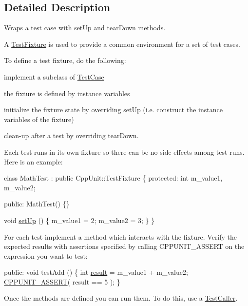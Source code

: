 \subsection{Detailed Description}
Wraps a test case with set\-Up and tear\-Down methods.

A \hyperlink{class_test_fixture}{Test\-Fixture} is used to provide a common environment for a set of test cases. 

To define a test fixture, do the following\-:
\begin{DoxyItemize}
\item implement a subclass of \hyperlink{class_test_case}{Test\-Case}
\item the fixture is defined by instance variables
\item initialize the fixture state by overriding set\-Up (i.\-e. construct the instance variables of the fixture)
\item clean-\/up after a test by overriding tear\-Down.
\end{DoxyItemize}

Each test runs in its own fixture so there can be no side effects among test runs. Here is an example\-:


\begin{DoxyCode}
\textcolor{keyword}{class }MathTest : \textcolor{keyword}{public} CppUnit::TestFixture \{
\textcolor{keyword}{protected}:
  \textcolor{keywordtype}{int} m\_value1, m\_value2;

\textcolor{keyword}{public}:
  MathTest() \{\}

  \textcolor{keywordtype}{void} \hyperlink{class_test_fixture_a0e77590b14a3ec7f93fe02e5b89a242f}{setUp} () \{
    m\_value1 = 2;
    m\_value2 = 3;
  \}
\}
\end{DoxyCode}


For each test implement a method which interacts with the fixture. Verify the expected results with assertions specified by calling C\-P\-P\-U\-N\-I\-T\-\_\-\-A\-S\-S\-E\-R\-T on the expression you want to test\-:


\begin{DoxyCode}
\textcolor{keyword}{public}: 
  \textcolor{keywordtype}{void} testAdd () \{
    \textcolor{keywordtype}{int} \hyperlink{glew_8h_a5fb5836a37f7607602a16ad733ed6357}{result} = m\_value1 + m\_value2;
    \hyperlink{_test_assert_8h_a5dc2efccfc9ec227747e3fc356e93904}{CPPUNIT\_ASSERT}( result == 5 );
  \}
\end{DoxyCode}


Once the methods are defined you can run them. To do this, use a \hyperlink{class_test_caller}{Test\-Caller}.



